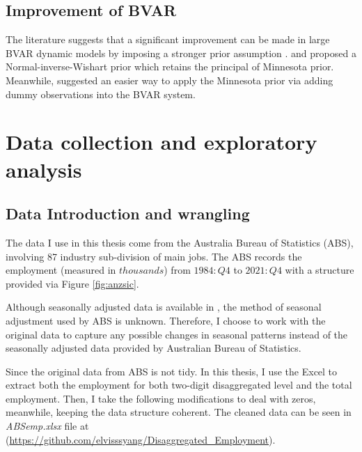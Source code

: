 \documentclass{monashthesis}
\begin{document}
\hypertarget{improvement-of-bvar}{%
\section{Improvement of BVAR}\label{improvement-of-bvar}}

The literature suggests that a significant improvement can be made in large BVAR dynamic models by imposing a stronger prior assumption \autocite{banbura2010large,litterman1986}. \textcite{robertson1999vector} and \textcite{kadiyala1997} proposed a Normal-inverse-Wishart prior which retains the principal of Minnesota prior. Meanwhile, \textcite{banbura2010large} suggested an easier way to apply the Minnesota prior via adding dummy observations into the BVAR system.

\hypertarget{data-collection-and-exploratory-analysis}{%
\chapter{Data collection and exploratory analysis}\label{data-collection-and-exploratory-analysis}}

\hypertarget{data-introduction-and-wrangling}{%
\section{Data Introduction and wrangling}\label{data-introduction-and-wrangling}}

The data I use in this thesis come from the Australia Bureau of Statistics (ABS), involving 87 industry sub-division of main jobs. The ABS records the employment (measured in \(thousands\)) from \(1984:Q4\) to \(2021:Q4\) with a structure provided via Figure \ref{fig:anzsic}.

Although seasonally adjusted data is available in \autocite{ABS2022}, the method of seasonal adjustment used by ABS is unknown. Therefore, I choose to work with the original data to capture any possible changes in seasonal patterns instead of the seasonally adjusted data provided by Australian Bureau of Statistics.

Since the original data from ABS is not tidy. In this thesis, I use the Excel to extract both the employment for both two-digit disaggregated level and the total employment. Then, I take the following modifications to deal with zeros, meanwhile, keeping the data structure coherent. The cleaned data can be seen in \emph{ABSemp.xlsx} file at (\url{https://github.com/elvisssyang/Disaggregated_Employment}).
\end{document}
